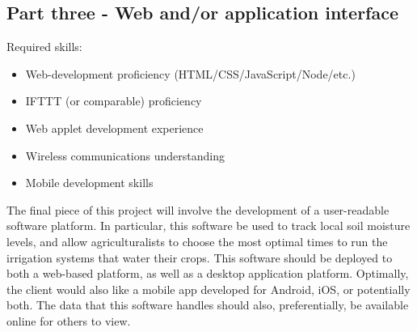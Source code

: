 \documentclass[onecolumn, draftclsnofoot,10pt, compsoc]{IEEEtran}
\begin{document}
	\subsection{Part three - Web and/or application interface}
	Required skills:
	\begin{itemize}
		\item Web-development proficiency (HTML/CSS/JavaScript/Node/etc.)
		\item IFTTT (or comparable) proficiency
		\item Web applet development experience
		\item Wireless communications understanding
		\item Mobile development skills
	\end{itemize}
	The final piece of this project will involve the development of a user-readable software platform.
	In particular, this software be used to track local soil moisture levels, and allow agriculturalists to choose the most optimal times to run the irrigation systems that water their crops.
	This software should be deployed to both a web-based platform, as well as a desktop application platform.
	Optimally, the client would also like a mobile app developed for Android, iOS, or potentially both.
	The data that this software handles should also, preferentially, be available online for others to view.
	
	\pagebreak
\end{document}
